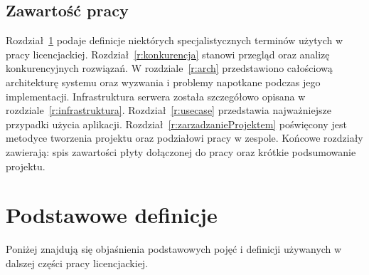 \documentclass[licencjacka]{pracamgr}
\begin{document}
\section*{Zawartość pracy}
Rozdział~\ref{r:definicje} podaje definicje niektórych specjalistycznych terminów użytych w pracy licencjackiej.
Rozdział~\ref{r:konkurencja} stanowi przegląd oraz analizę konkurencyjnych rozwiązań. W rozdziale~\ref{r:arch} przedstawiono całościową architekturę systemu oraz wyzwania i problemy napotkane podczas jego implementacji. Infrastruktura serwera została szczegółowo opisana w rozdziale~\ref{r:infrastruktura}. Rozdział~\ref{r:usecase} przedstawia najważniejsze przypadki użycia aplikacji.  Rozdział~\ref{r:zarzadzanieProjektem} poświęcony jest metodyce tworzenia projektu oraz podziałowi pracy w zespole. Końcowe rozdziały zawierają: spis zawartości płyty dołączonej do pracy oraz krótkie podsumowanie projektu.

\chapter{Podstawowe definicje}\label{r:definicje}

Poniżej znajdują się objaśnienia podstawowych pojęć i definicji używanych w dalszej części pracy licencjackiej.
\end{document}
